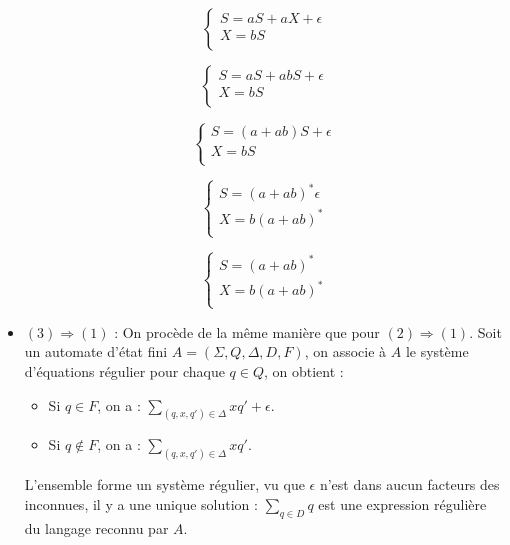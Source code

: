 \begin{itemize}
	\[
	   \left \{
	   \begin{array}{cc}
	  		S = aS + aX + \epsilon\\
	    	X = bS\\
	   \end{array}
	   \right .
	\]

	\[
	   \left \{
	   \begin{array}{cc}
	  		S = aS + abS + \epsilon\\
	    	X = bS\\
	   \end{array}
	   \right .
	\]

	\[
	   \left \{
	   \begin{array}{cc}
	  		 S = (a+ab)S + \epsilon\\
	    	X = bS\\
	   \end{array}
	   \right .
	\]

	\[
	   \left \{
	   \begin{array}{cc}
	  		S = (a+ab)^*\epsilon\\
	    	X = b(a+ab)^*\\
	   \end{array}
	   \right .
	\]

	\[
	   \left \{
	   \begin{array}{cc}
	  		S = (a+ab)^*\\
	    	X = b(a+ab)^*\\
	   \end{array}
	   \right .
	\]

	\item $(3) \Rightarrow (1)$ : On procède de la même manière que pour $(2) \Rightarrow (1)$. Soit un automate d'état fini $A=(\Sigma,Q,\Delta,D,F)$, on associe à $A$ le système d'équations régulier pour chaque $q \in Q$, on obtient :\\

	\begin{itemize}
		\item Si $q \in F$, on a : $\sum\limits_{(q,x,q') \in \Delta} x q' + \epsilon$.
		\item Si $q \not \in F$, on a : $\sum\limits_{(q,x,q') \in \Delta} x q'$.
	\end{itemize}

	L'ensemble forme un système régulier, vu que $\epsilon$ n'est dans aucun facteurs des inconnues, il y a une unique solution : $\sum\limits_{q \in D}q$ est une expression régulière du langage reconnu par $A$.


\end{itemize}
